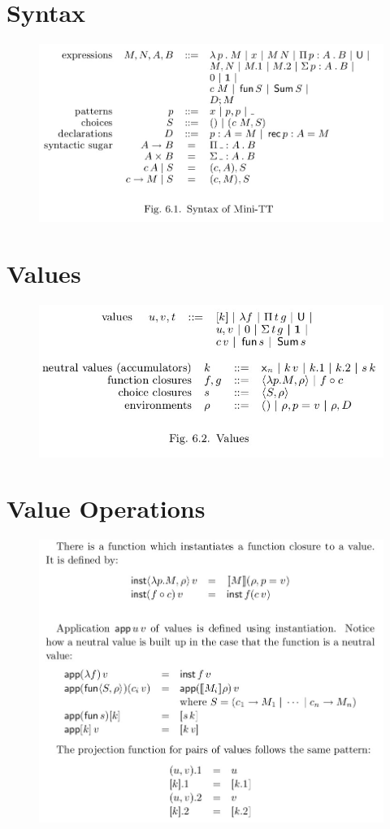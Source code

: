 \documentclass{article}
\begin{document}
\section{Syntax}
\begin{figure}[h]
  \includegraphics[scale=0.4]{syntax_minitt}
\end{figure}

\section{Values}
\begin{figure}[h]
  \includegraphics[scale=0.5]{values_minitt}
\end{figure}

\section{Value Operations}
\begin{figure}[h]
  \includegraphics[scale=0.4]{voper_minitt}
\end{figure}
\end{document}

